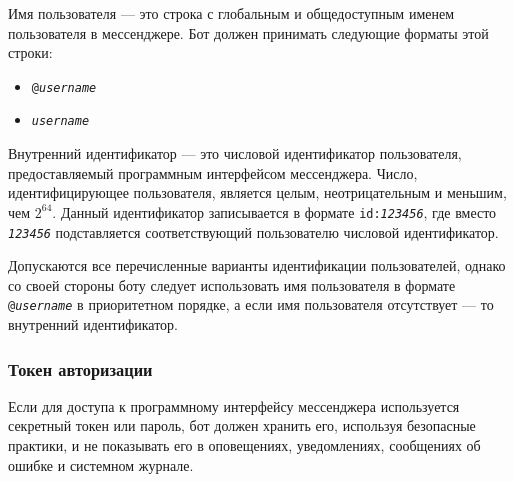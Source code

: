     Имя пользователя --- это строка с глобальным и общедоступным именем пользователя в мессенджере.
    Бот должен принимать следующие форматы этой строки:
    \begin{itemize}
        \item
            \texttt{@\textit{username}}
        \item
            \texttt{\textit{username}}
    \end{itemize}
    
    Внутренний идентификатор --- это числовой идентификатор пользователя, предоставляемый
    программным интерфейсом мессенджера. Число, идентифицирующее пользователя, является целым,
    неотрицательным и меньшим, чем \(2^{64}\). Данный идентификатор записывается в формате
    \texttt{id:\textit{123456}}, где вместо \texttt{\textit{123456}} подставляется соответствующий
    пользователю числовой идентификатор.

    Допускаются все перечисленные варианты идентификации пользователей, однако со своей стороны боту
    следует использовать имя пользователя в формате \texttt{@\textit{username}} в приоритетном порядке,
    а если имя пользователя отсутствует --- то внутренний идентификатор.

\subsubsection{Токен авторизации}
    \label{sec:req:sec:token}
    Если для доступа к программному интерфейсу мессенджера используется секретный токен или пароль,
    бот должен хранить его, используя безопасные практики, и не показывать его в оповещениях, уведомлениях,
    сообщениях об ошибке и системном журнале.
